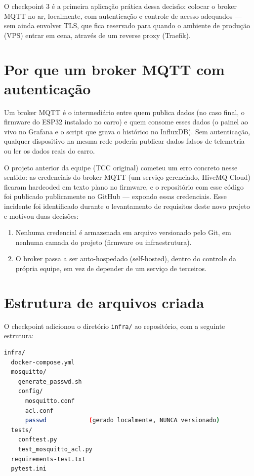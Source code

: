 \documentclass[11pt,a4paper]{article}
\begin{document}
O checkpoint 3 é a primeira aplicação prática dessa decisão: colocar o broker MQTT no ar, localmente, com autenticação e controle de acesso adequados --- sem ainda envolver TLS, que fica reservado para quando o ambiente de produção (VPS) entrar em cena, através de um reverse proxy (Traefik).

\section{Por que um broker MQTT com autenticação}

Um broker MQTT é o intermediário entre quem publica dados (no caso final, o firmware do ESP32 instalado no carro) e quem consome esses dados (o painel ao vivo no Grafana e o script que grava o histórico no InfluxDB). Sem autenticação, qualquer dispositivo na mesma rede poderia publicar dados falsos de telemetria ou ler os dados reais do carro.

O projeto anterior da equipe (TCC original) cometeu um erro concreto nesse sentido: as credenciais do broker MQTT (um serviço gerenciado, HiveMQ Cloud) ficaram hardcoded em texto plano no firmware, e o repositório com esse código foi publicado publicamente no GitHub --- expondo essas credenciais. Esse incidente foi identificado durante o levantamento de requisitos deste novo projeto e motivou duas decisões:

\begin{enumerate}
    \item Nenhuma credencial é armazenada em arquivo versionado pelo Git, em nenhuma camada do projeto (firmware ou infraestrutura).
    \item O broker passa a ser auto-hospedado (self-hosted), dentro do controle da própria equipe, em vez de depender de um serviço de terceiros.
\end{enumerate}

\section{Estrutura de arquivos criada}

O checkpoint adicionou o diretório \texttt{infra/} ao repositório, com a seguinte estrutura:

\begin{lstlisting}[language=bash,caption={Estrutura do diretório infra/}]
infra/
  docker-compose.yml
  mosquitto/
    generate_passwd.sh
    config/
      mosquitto.conf
      acl.conf
      passwd            (gerado localmente, NUNCA versionado)
  tests/
    conftest.py
    test_mosquitto_acl.py
  requirements-test.txt
  pytest.ini
\end{lstlisting}
\end{document}
